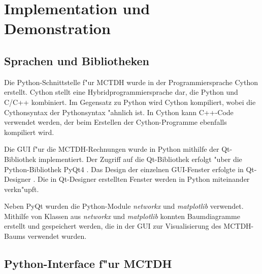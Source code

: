 \chapter{Implementation und Demonstration}
\label{cha:Implementation}

\section{Sprachen und Bibliotheken}

Die Python-Schnittstelle f"ur MCTDH wurde in der Programmiersprache Cython \cite{PyArt} erstellt. 
Cython stellt eine Hybridprogrammiersprache dar,
die Python und C/C++ kombiniert. Im Gegensatz zu Python
wird Cython kompiliert, wobei die Cythonsyntax der Pythonsyntax "ahnlich ist.
In Cython kann C++-Code verwendet werden, der beim Erstellen der Cython-Programme ebenfalls kompiliert wird.

Die GUI f"ur die MCTDH-Rechnungen wurde in Python mithilfe der Qt-Bibliothek \cite{Qt} implementiert.
Der Zugriff auf die Qt-Bibliothek  erfolgt "uber die Python-Bibliothek PyQt4 \cite{PyQt}. 
Das Design der einzelnen GUI-Fenster erfolgte in Qt-Designer \cite{Qt-Designer}. 
Die in Qt-Designer erstellten Fenster werden in Python miteinander verkn"upft.

Neben PyQt wurden die Python-Module \textit{networkx} \cite{SciPyProceedings_11} und \textit{matplotlib} \cite{Hunter:2007} verwendet.
Mithilfe von Klassen aus \textit{networkx} und \textit{matplotlib} konnten Baumdiagramme erstellt und gespei\-chert werden, die in der GUI zur 
Visualisierung des MCTDH-Baums verwendet wurden.

\section{Python-Interface f"ur MCTDH}
\label{sec:PyInterface}

